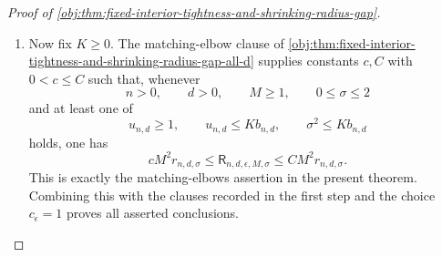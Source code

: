 \begin{proof}[Proof of \cref{obj:thm:fixed-interior-tightness-and-shrinking-radius-gap}]
\begin{enumerate}
\item Now fix \(K\ge0\).  The matching-elbow clause of \cref{obj:thm:fixed-interior-tightness-and-shrinking-radius-gap-all-d} supplies constants \(c,C\) with \(0<c\le C\) such that, whenever
\[
n>0,\qquad d>0,\qquad M\ge1,\qquad 0\le\sigma\le2
\]
and at least one of
\[
u_{n,d}\ge1,\qquad
u_{n,d}\le Kb_{n,d},\qquad
\sigma^2\le Kb_{n,d}
\]
holds, one has
\[
cM^2r_{n,d,\sigma}
\le
\mathsf R_{n,d,\epsilon,M,\sigma}
\le
CM^2r_{n,d,\sigma}.
\]
This is exactly the matching-elbows assertion in the present theorem.  Combining this with the clauses recorded in the first step and the choice \(c_\epsilon=1\) proves all asserted conclusions.  %
\end{enumerate}
\end{proof}

